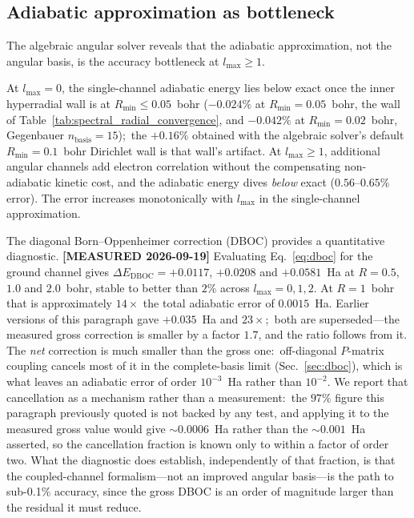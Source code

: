 \documentclass[aps,pra,twocolumn,superscriptaddress,longbibliography]{revtex4-2}
\begin{document}
\subsection{Adiabatic approximation as bottleneck}
\label{sec:adiabatic_bottleneck}

The algebraic angular solver reveals that the adiabatic approximation,
not the angular basis, is the accuracy bottleneck at $l_{\max} \ge 1$.

At $l_{\max} = 0$, the single-channel adiabatic energy lies below
exact once the inner hyperradial wall is at $R_{\min} \le 0.05$~bohr
($-0.024\%$ at $R_{\min} = 0.05$~bohr, the wall of
Table~\ref{tab:spectral_radial_convergence}, and $-0.042\%$ at
$R_{\min} = 0.02$~bohr, Gegenbauer $n_{\mathrm{basis}} = 15$);\ the
$+0.16\%$ obtained with the algebraic solver's default
$R_{\min} = 0.1$~bohr Dirichlet wall is that wall's artifact.  At $l_{\max} \ge 1$,
additional angular channels add electron correlation without the
compensating non-adiabatic kinetic cost, and the adiabatic energy
dives \emph{below} exact ($0.56$--$0.65\%$ error).  The error
increases monotonically with $l_{\max}$ in the single-channel
approximation.

The diagonal Born--Oppenheimer correction (DBOC) provides a
quantitative diagnostic.  \textbf{[MEASURED 2026-09-19]} Evaluating
Eq.~\eqref{eq:dboc} for the ground channel gives
$\Delta E_{\mathrm{DBOC}} = +0.0117$, $+0.0208$ and $+0.0581$~Ha at
$R = 0.5$, $1.0$ and $2.0$~bohr, stable to better than $2\%$ across
$l_{\max} = 0, 1, 2$.  At $R = 1$~bohr that is approximately
$14\times$ the total adiabatic error of $0.0015$~Ha.  Earlier versions
of this paragraph gave $+0.035$~Ha and $23\times$;\ both are
superseded---the measured gross correction is smaller by a factor
$1.7$, and the ratio follows from it.  The \emph{net} correction is
much smaller than the gross one:\ off-diagonal $P$-matrix coupling
cancels most of it in the complete-basis limit
(Sec.~\ref{sec:dboc}), which is what leaves an adiabatic error of
order $10^{-3}$~Ha rather than $10^{-2}$.  We report that
cancellation as a mechanism rather than a measurement:\ the $97\%$
figure this paragraph previously quoted is not backed by any test,
and applying it to the measured gross value would give
$\sim\!0.0006$~Ha rather than the $\sim\!0.001$~Ha asserted, so the
cancellation fraction is known only to within a factor of order two.
What the diagnostic does establish, independently of that fraction,
is that the coupled-channel formalism---not an improved angular
basis---is the path to sub-0.1\% accuracy, since the gross DBOC is an
order of magnitude larger than the residual it must reduce.
\end{document}
